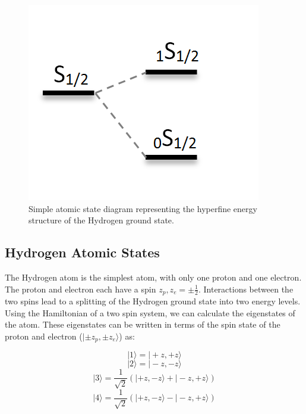 \begin{figure}[htb]
\begin{center}
\includegraphics[width=0.95\linewidth]{Introduction/figures/1s_spin_states.png}
\caption{Simple atomic state diagram representing the hyperfine energy structure of the Hydrogen ground state.}
\label{Fig:spin_states}
\end{center}
\end{figure}


\subsection{Hydrogen Atomic States}

The Hydrogen atom is the simplest atom, with only one proton and one electron. The proton and electron each have a spin $z_p,z_e = \pm \frac{1}{2}$. Interactions between the two spins lead to a splitting of the Hydrogen ground state into two energy levels. Using the Hamiltonian of a two spin system, we can calculate the eigenstates of the atom. These eigenstates can be written in terms of the spin state of the proton and electron ($| \pm z_p, \pm z_e \rangle$) as:

\begin{equation}
| 1 \rangle = | + z , + z \rangle 
\end{equation}
\begin{equation}
| 2 \rangle = | - z, - z \rangle 
\end{equation}
\begin{equation}
| 3 \rangle = \frac{1}{\sqrt{2}} (| + z, - z \rangle + |-z, +z \rangle) 
\end{equation}
\begin{equation}
| 4 \rangle = \frac{1}{\sqrt{2}} (| + z, - z \rangle - |-z, +z \rangle)
\end{equation}


